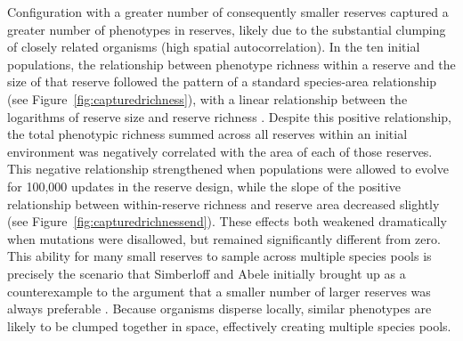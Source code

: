 \documentclass[letterpaper]{article}
\begin{document}
    Configuration with a greater number of consequently smaller reserves captured a greater number of phenotypes in reserves, likely due to the substantial clumping of closely related organisms (high spatial autocorrelation). In the ten initial populations, the relationship between phenotype richness within a reserve and the size of that reserve followed the pattern of a standard species-area relationship (see Figure~\ref{fig:capturedrichness}), with a linear relationship between the logarithms of reserve size and reserve richness \citep{connor_statistics_1979}. Despite this positive relationship, the total phenotypic richness summed across all reserves within an initial environment was negatively correlated with the area of each of those reserves. This negative relationship strengthened when populations were allowed to evolve for 100,000 updates in the reserve design, while the slope of the positive relationship between within-reserve richness and reserve area decreased slightly (see Figure~\ref{fig:capturedrichnessend}). These effects both weakened dramatically when mutations were disallowed, but remained significantly different from zero. This ability for many small reserves to sample across multiple species pools is precisely the scenario that Simberloff and Abele initially brought up as a counterexample to the argument that a smaller number of larger reserves was always preferable \citep{simberloff_island_1976}. Because organisms disperse locally, similar phenotypes are likely to be clumped together in space, effectively creating multiple species pools. 
%
%
%
%
%
%
%
%
%
%
\end{document}

